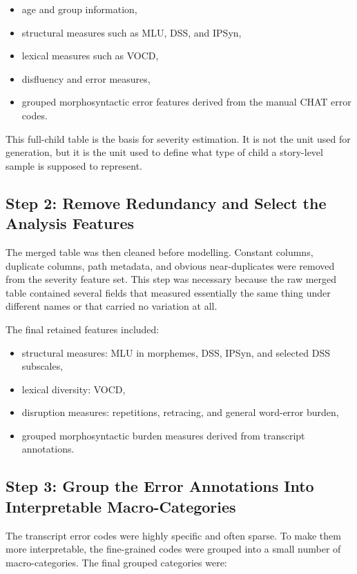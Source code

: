 \begin{itemize}
    \item age and group information,
    \item structural measures such as MLU, DSS, and IPSyn,
    \item lexical measures such as VOCD,
    \item disfluency and error measures,
    \item grouped morphosyntactic error features derived from the manual CHAT error codes.
\end{itemize}

This full-child table is the basis for severity estimation. It is not the unit used for generation, but it is the unit used to define what type of child a story-level sample is supposed to represent.

\subsection{Step 2: Remove Redundancy and Select the Analysis Features}

The merged table was then cleaned before modelling. Constant columns, duplicate columns, path metadata, and obvious near-duplicates were removed from the severity feature set. This step was necessary because the raw merged table contained several fields that measured essentially the same thing under different names or that carried no variation at all.

The final retained features included:

\begin{itemize}
    \item structural measures: MLU in morphemes, DSS, IPSyn, and selected DSS subscales,
    \item lexical diversity: VOCD,
    \item disruption measures: repetitions, retracing, and general word-error burden,
    \item grouped morphosyntactic burden measures derived from transcript annotations.
\end{itemize}

\subsection{Step 3: Group the Error Annotations Into Interpretable Macro-Categories}

The transcript error codes were highly specific and often sparse. To make them more interpretable, the fine-grained codes were grouped into a small number of macro-categories. The final grouped categories were:


